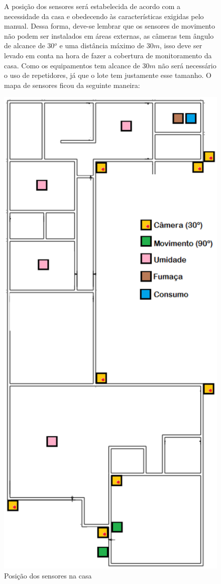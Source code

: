 \begin{figure}[h]
	A posição dos sensores será estabelecida de acordo com a necessidade da casa e obedecendo às características exigidas pelo manual. Dessa forma, deve-se lembrar que os sensores de movimento não podem ser instalados em áreas externas, as câmeras tem ângulo de alcance de $30{^o}$ e uma distância máximo de $30m$, isso deve ser levado em conta na hora de fazer a cobertura de monitoramento da casa. Como os equipamentos tem alcance de $30m$ não será necessário o uso de repetidores, já que o lote tem justamente esse tamanho. O mapa de sensores ficou da seguinte maneira:

  \begin{center}
	\includegraphics[keepaspectratio,scale=0.55,angle=90]{figuras/posicao.eps}
	\caption{Posição dos sensores na casa}
  \end{center}
\end{figure}
